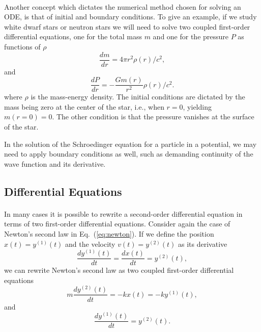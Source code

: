 \documentclass[%
oneside,                 %
final,                   %
10pt]{article}
\begin{document}
\paragraph{}
Another concept which dictates the numerical method chosen
for solving an ODE, is that of initial and boundary conditions.
To give an example, if we study white dwarf stars or neutron stars
we will need to solve two coupled first-order differential
equations, one for the total mass $m$ and one for the 
pressure $P$ as functions of 
$\rho$ 
\[
\frac{dm}{dr}=4\pi r^{2}\rho (r)/c^2,
\]
and
\[
\frac{dP}{dr}=-\frac{Gm(r)}{r^{2}}\rho (r)/c^2.
\]
where $\rho$ is the mass-energy density.
The initial conditions are dictated by the mass being
zero at the center of the star, i.e., when $r=0$,
yielding $m(r=0)=0$. The other condition is that
the pressure vanishes at the surface of the star.

In the solution of the Schroedinger equation for a particle
in a potential, we may need to apply boundary conditions as well,
such as demanding continuity of the wave function and its derivative.



\subsection*{Differential Equations}

\paragraph{}
In many cases it is possible to rewrite a second-order
differential equation in terms of two first-order differential
equations. Consider again the case of Newton's second law in Eq.~(\ref{eq:newton}). If we define the position $x(t)=y^{(1)}(t)$ 
and the velocity $v(t)=y^{(2)}(t)$ as its derivative 
\begin{equation} 
   \frac{dy^{(1)}(t)}{dt}=\frac{dx(t)}{dt}=y^{(2)}(t),
\end{equation}
we can rewrite Newton's second law as two coupled first-order
differential equations
\begin{equation} 
   m\frac{dy^{(2)}(t)}{dt}=-kx(t)=-ky^{(1)}(t),
    \label{eq:n1}
\end{equation}
and 
\begin{equation}
\frac{dy^{(1)}(t)}{dt}=y^{(2)}(t). \label{eq:n2}
\end{equation}
\end{document}
